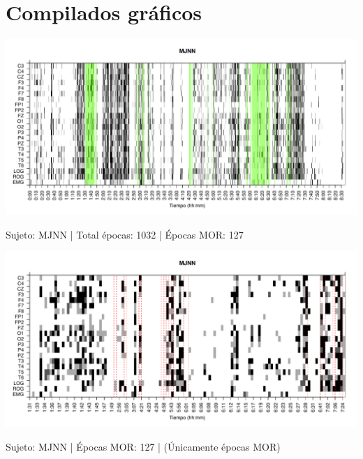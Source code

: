 
%
%


\section{Compilados gr\'aficos}

\begin{SidewaysFigure}
\centering
\includegraphics[width=\linewidth]
{./material_bonito170220/MJNNVIGILOS_127_mor127_tot1032_est_total.pdf} 
\caption{Sujeto: MJNN | Total \'epocas: 1032 | \'Epocas MOR: 127}
\end{SidewaysFigure}
\begin{SidewaysFigure}
\centering
\includegraphics[width=\linewidth]
{./material_bonito170220/MJNNVIGILOS_127_mor127_tot127_est_mor.pdf} 
\caption{Sujeto: MJNN | \'Epocas MOR: 127 | (\'Unicamente \'epocas MOR)}
\end{SidewaysFigure}

